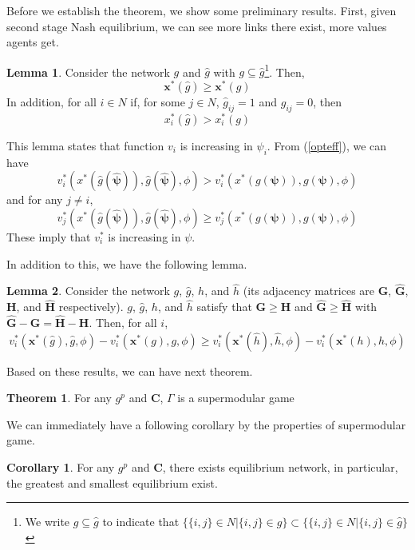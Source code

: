 \documentclass[12pt]{article}
\theoremstyle{definition}
\newtheorem{theorem}{Theorem}
\newtheorem{lemma}{Lemma}
\newtheorem{corollary}{Corollary}
\begin{document}
Before we establish the theorem, we show some preliminary results.
First, given second stage Nash equilibrium, we can see more links there exist, more values agents get.

\begin{lemma}
	Consider the network $g$ and $\hat{g}$ with $g \subseteq \hat{g}$\footnote{We write $g \subseteq \hat{g}$ to indicate that $\{\{i,j\} \in N | \{i,j\} \in g\} \subset \{\{i,j\} \in N | \{i,j\} \in \hat{g}\}$}.
	Then,
	\[ \bm{x}^*(\hat{g}) \ge \bm{x}^*(g) \]
	In addition, for all $i \in N$ if, for some $j \in N$, $\hat{g}_{ij} = 1$ and $g_{ij} = 0$, then
	\[ x_i^*(\hat{g}) > x_i^*(g) \]
\end{lemma}

This lemma states that function $v_i$ is increasing in $\psi_i$.
From (\ref{opteff}), we can have 
\[ v_i^*(x^*(\hat{g}(\bm{\hat{\psi}})), \hat{g}(\bm{\hat{\psi}}), \phi) > v_i^*(x^*(g(\bm{\psi})), g(\bm{\psi}), \phi)\]
and for any $j \neq i$,
\[ v_j^*(x^*(\hat{g}(\bm{\hat{\psi}})), \hat{g}(\bm{\hat{\psi}}), \phi) \ge v_j^*(x^*(g(\bm{\psi})), g(\bm{\psi}), \phi)\]
These imply that $v_i^*$ is increasing in $\psi$.

In addition to this, we have the following lemma.

\begin{lemma}
	Consider the network $g$, $\hat{g}$, $h$, and $\hat{h}$ (its adjacency matrices are $\bm{G}$, $\bm{\hat{G}}$, $\bm{H}$, and $\bm{\hat{H}}$ respectively).
	$g$, $\hat{g}$, $h$, and $\hat{h}$ satisfy that $\bm{G} \ge \bm{H}$ and  $\bm{\hat{G}} \ge \bm{\hat{H}}$ with $\bm{\hat{G}} - \bm{G} = \bm{\hat{H}} - \bm{H}$.
	Then, for all $i$,
	\[ v_i^*(\bm{x}^*(\hat{g}), \hat{g}, \phi) - v_i^*(\bm{x}^*(g), g, \phi) \ge v_i^*(\bm{x}^*(\hat{h}), \hat{h}, \phi) - v_i^*(\bm{x}^*(h), h, \phi)\]
\end{lemma}

Based on these results, we can have next theorem.

\begin{theorem}
	For any $g^p$ and $\bm{C}$, $\Gamma$ is a supermodular game
\end{theorem}

We can immediately have a following corollary by the properties of supermodular game.

\begin{corollary}
	For any $g^p$ and $\bm{C}$, there exists equilibrium network, in particular, the greatest and smallest equilibrium exist.
\end{corollary}
\end{document}
